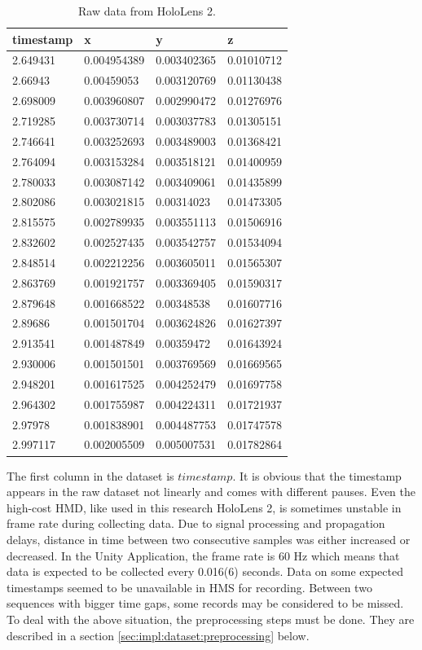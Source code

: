 \begin{table}[!ht]
		\footnotesize
		\centering
	\begin{tabular}{|l|l|l|l|}
		\hline
		timestamp & x & y & z \\ [0.5ex] 
		\hline\hline
		2.649431 & 0.004954389 & 0.003402365 & 0.01010712 \\ \hline
		2.66943 & 0.00459053 & 0.003120769 & 0.01130438 \\ \hline
		2.698009 & 0.003960807 & 0.002990472 & 0.01276976 \\ \hline
		2.719285 & 0.003730714 & 0.003037783 & 0.01305151 \\ \hline
		2.746641 & 0.003252693 & 0.003489003 & 0.01368421 \\ \hline
		2.764094 & 0.003153284 & 0.003518121 & 0.01400959 \\ \hline
		2.780033 & 0.003087142 & 0.003409061 & 0.01435899 \\ \hline
		2.802086 & 0.003021815 & 0.00314023 & 0.01473305 \\ \hline
		2.815575 & 0.002789935 & 0.003551113 & 0.01506916 \\ \hline
		2.832602 & 0.002527435 & 0.003542757 & 0.01534094 \\ \hline
		2.848514 & 0.002212256 & 0.003605011 & 0.01565307 \\ \hline
		2.863769 & 0.001921757 & 0.003369405 & 0.01590317 \\ \hline
		2.879648 & 0.001668522 & 0.00348538 & 0.01607716 \\ \hline
		2.89686 & 0.001501704 & 0.003624826 & 0.01627397 \\ \hline
		2.913541 & 0.001487849 & 0.00359472 & 0.01643924 \\ \hline
		2.930006 & 0.001501501 & 0.003769569 & 0.01669565 \\ \hline
		2.948201 & 0.001617525 & 0.004252479 & 0.01697758 \\ \hline
		2.964302 & 0.001755987 & 0.004224311 & 0.01721937 \\ \hline
		2.97978 & 0.001838901 & 0.004487753 & 0.01747578 \\ \hline
		2.997117 & 0.002005509 & 0.005007531 & 0.01782864 \\ \hline
	\end{tabular}
\caption{\label{tab:raw_data}Raw data from HoloLens 2.}
\end{table}

The first column in the dataset is $timestamp$. It is obvious that the timestamp appears in the raw dataset not linearly and comes with different pauses. Even the high-cost HMD, like used in this research HoloLens 2, is sometimes unstable in frame rate during collecting data. Due to signal processing and propagation delays, distance in time between two consecutive samples was either increased or decreased. In the Unity Application, the frame rate is 60 Hz which means that data is expected to be collected every 0.016(6) seconds. Data on some expected timestamps seemed to be unavailable in HMS for recording. Between two sequences with bigger time gaps, some records may be considered to be missed. To deal with the above situation, the preprocessing steps must be done. They are described in a section \ref{sec:impl:dataset:preprocessing} below. 

